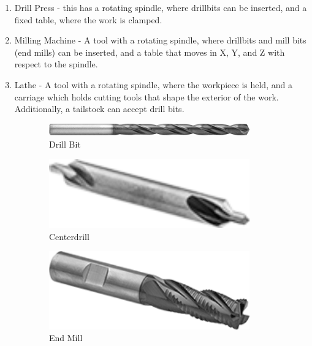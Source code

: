 \documentclass[10pt,letterpaper]{book}
\begin{document}
 \begin{enumerate}[label=\alph*]
 	\item Drill Press - this has a rotating spindle, where drillbits can be inserted, and a fixed table, where the work is clamped.
 	\item Milling Machine - A tool with a rotating spindle, where drillbits and mill bits (end mills) can be inserted, and a table that moves in X, Y, and Z with respect to the spindle.
 	\item Lathe - A tool with a rotating spindle, where the workpiece is held, and a carriage which holds cutting tools that shape the exterior of the work. Additionally, a tailstock can accept drill bits.
 \end{enumerate}
 
 \begin{figure}[H]
	\centering
	\begin{subfigure}[b]{.19\linewidth}
		\includegraphics[width=0.95\textwidth]{imgs/drillbit.png}
		\caption{Drill Bit}
	\end{subfigure} \begin{subfigure}[b]{.19\linewidth}
		\includegraphics[width=0.95\textwidth]{imgs/centerdrill.png}
		\caption{Centerdrill}
	\end{subfigure}	\begin{subfigure}[b]{.19\linewidth}
		\includegraphics[width=0.95\textwidth]{imgs/endmill.png}
		\caption{End Mill}
	\end{subfigure}	\begin{subfigure}[b]{.19\linewidth}

\end{subfigure}
\end{figure}
\end{document}

